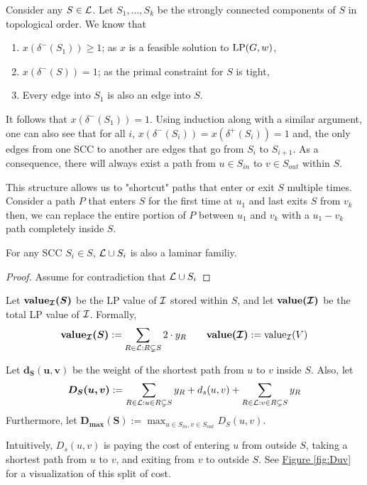 
	Consider any $S\in \mathcal{L}$. Let $S_1,\dots, S_k$ be the strongly connected components of $S$ in topological order. 
	We know that
	\begin{enumerate}
		\item $x(\delta^-(S_1)) \geq 1$; as $x$ is a feasible solution to $\textup{LP}(G,w)$,
		\item $x(\delta^-(S)) = 1$; as the primal constraint for $S$ is tight,
		\item Every edge into $S_1$ is also an edge into $S$.
	\end{enumerate}
	It follows that $x(\delta^-(S_1)) = 1$. 
	Using induction along with a similar argument, one can also see that for all $i$, $x(\delta^-(S_i)) = x(\delta^+(S_i)) = 1$ and, the only edges from one SCC to another are edges that go from $S_i$ to $S_{i + 1}$. 
	As a consequence, there will always exist a path from $u\in S_{in}$ to $v\in S_{out}$ within $S$.
	
	This structure allows us to "shortcut" paths that enter or exit $S$ multiple times. Consider a path $P$ that enters $S$ for the first time at $u_1$ and last exits $S$ from $v_k$ then, we can replace the entire portion of $P$ between $u_1$ and $v_k$ with a $u_1 - v_k$ path completely inside $S$.\\
	
	\begin{lemma}\label{lemm:2:SiAgree}
		For any SCC $S_i \in S$, $\mathcal{L} \cup S_i$ is also a laminar familiy.
	\end{lemma}
	\begin{proof}
		Assume for contradiction that $\mathcal{L} \cup S_i$ 
	\end{proof}
	
	\begin{definition}\label{def:value}
		Let $\bm{\textbf{\textup{value}}_{\mathcal{I}}(S)}$ be the LP value of $\mathcal{I}$ stored within $S$, and let $\bm{\textbf{\textup{value}}(\mathcal{I})}$ be the total LP value of $\mathcal{I}$. Formally, 
		\[
			\bm{\textbf{\textup{value}}_{\mathcal{I}}(S)}:=\sum\limits_{R\in \mathcal{L}:R\subsetneq S}2\cdot y_R\qquad \bm{\textbf{\textup{value}}(\mathcal{I})}:=\textup{value}_{\mathcal{I}}(V)
		\]
	\end{definition}
	
	\begin{definition} 
		Let $\bm{d_S(u,v)}$ be the weight of the shortest path from $u$ to $v$ inside $S$. Also, let 
		\begin{equation}
			\bm{D_S(u,v)}:=\sum_{R\in \mathcal{L} : u\in R\subsetneq S}y_R + d_s(u,v) + \sum_{R\in \mathcal{L} : v\in R\subsetneq S}y_R\label{def:1}
		\end{equation}
		Furthermore, let $\bm{D_{\max}(S)} := \max_{u \in S_{in}, v \in S_{out}}D_S(u,v)$.
		
		Intuitively, $D_s(u,v)$ is paying the cost of entering $u$ from outside $S$, taking a shortest path from $u$ to $v$, and exiting from $v$ to outside $S$. See \hyperref[fig:Duv]{Figure \ref{fig:Duv}} for a visualization of this split of cost.\\
	\end{definition}
	
	
